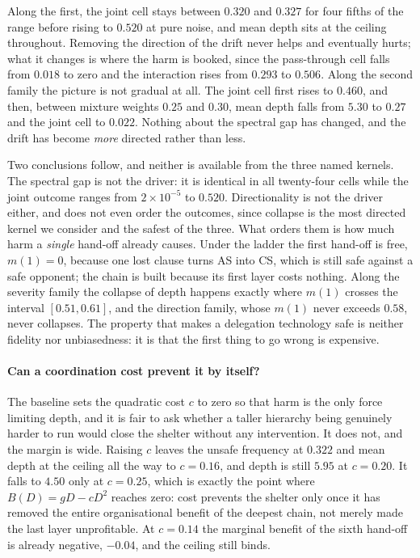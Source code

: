 \documentclass[11pt,a4paper]{article}
\theoremstyle{definition}
\newcommand{\AS}{\textsf{AS}}
\newcommand{\CS}{\textsf{CS}}
\begin{document}
Along the first, the joint cell stays between $0.320$ and $0.327$ for four
fifths of the range before rising to $0.520$ at pure noise, and mean depth sits
at the ceiling throughout. Removing the direction of the drift never helps and
eventually hurts; what it changes is where the harm is booked, since the
pass-through cell falls from $0.018$ to zero and the interaction rises from
$0.293$ to $0.506$. Along the second family the picture is not gradual at all.
The joint cell first rises to $0.460$, and then, between mixture weights $0.25$
and $0.30$, mean depth falls from $5.30$ to $0.27$ and the joint cell to
$0.022$. Nothing about the spectral gap has changed, and the drift has become
\emph{more} directed rather than less.

Two conclusions follow, and neither is available from the three named kernels.
The spectral gap is not the driver: it is identical in all twenty-four cells
while the joint outcome ranges from $2\times10^{-5}$ to $0.520$. Directionality
is not the driver either, and does not even order the outcomes, since collapse
is the most directed kernel we consider and the safest of the three. What
orders them is how much harm a \emph{single} hand-off already causes. Under the
ladder the first hand-off is free, $m(1)=0$, because one lost clause turns
\AS{} into \CS{}, which is still safe against a safe opponent; the chain is
built because its first layer costs nothing. Along the severity family the
collapse of depth happens exactly where $m(1)$ crosses the interval
$[0.51,0.61]$, and the direction family, whose $m(1)$ never exceeds $0.58$,
never collapses. The property that makes a delegation technology safe is
neither fidelity nor unbiasedness: it is that the first thing to go wrong is
expensive.

\paragraph{Can a coordination cost prevent it by itself?}
The baseline sets the quadratic cost $c$ to zero so that harm is the only force
limiting depth, and it is fair to ask whether a taller hierarchy being
genuinely harder to run would close the shelter without any intervention. It
does not, and the margin is wide. Raising $c$ leaves the unsafe frequency at
$0.322$ and mean depth at the ceiling all the way to $c=0.16$, and depth is
still $5.95$ at $c=0.20$. It falls to $4.50$ only at $c=0.25$, which is exactly
the point where $B(D)=gD-cD^{2}$ reaches zero: cost prevents the shelter only
once it has removed the entire organisational benefit of the deepest chain, not
merely made the last layer unprofitable. At $c=0.14$ the marginal benefit of
the sixth hand-off is already negative, $-0.04$, and the ceiling still binds.
\end{document}
